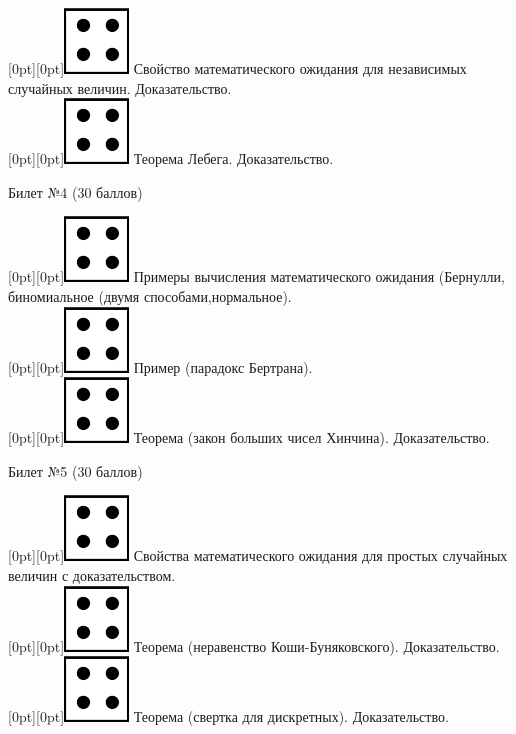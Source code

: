 \documentclass[10pt]{article}
\begin{document}
\raisebox{-1pt}[0pt][0pt]{\includegraphics[width=0.02\linewidth]{4.png}} Свойство  математического ожидания для независимых случайных величин. Доказательство. \\
\raisebox{-1pt}[0pt][0pt]{\includegraphics[width=0.02\linewidth]{4.png}} Теорема Лебега. Доказательство. \\
\begin{center} {\Large Билет №4 (30 баллов)} \end{center}
\raisebox{-1pt}[0pt][0pt]{\includegraphics[width=0.02\linewidth]{4.png}} Примеры вычисления математического ожидания (Бернулли, биномиальное (двумя способами,нормальное). \\
\raisebox{-1pt}[0pt][0pt]{\includegraphics[width=0.02\linewidth]{4.png}} Пример (парадокс Бертрана). \\ 
\raisebox{-1pt}[0pt][0pt]{\includegraphics[width=0.02\linewidth]{4.png}}  Теорема (закон больших чисел Хинчина).  Доказательство. \\
\begin{center} {\Large Билет №5 (30 баллов)} \end{center}
\raisebox{-1pt}[0pt][0pt]{\includegraphics[width=0.02\linewidth]{4.png}} Свойства математического ожидания для  простых случайных величин с доказательством. \\
\raisebox{-1pt}[0pt][0pt]{\includegraphics[width=0.02\linewidth]{4.png}} Теорема (неравенство Коши-Буняковского). Доказательство. \\
\raisebox{-1pt}[0pt][0pt]{\includegraphics[width=0.02\linewidth]{4.png}} Теорема (свертка для дискретных). Доказательство. \\
\end{document}

